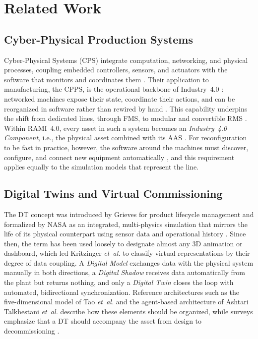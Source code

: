 \documentclass{ieeeojies}
\newcommand{\etal}{\textit{et~al.}}
\begin{document}
\section{Related Work}
\label{sec:related_work}

\subsection{Cyber-Physical Production Systems}
\label{sec:rw_cpps}

Cyber-Physical Systems (CPS) integrate computation, networking, and physical processes, coupling embedded controllers, sensors, and actuators with the software that monitors and coordinates them \cite{Abdel-Aty2022}. Their application to manufacturing, the CPPS, is the operational backbone of Industry~4.0 \cite{Kagermann2022,Hermann2016}: networked machines expose their state, coordinate their actions, and can be reorganized in software rather than rewired by hand \cite{AshtariTalkhestani2019}. This capability underpins the shift from dedicated lines, through FMS, to modular and convertible RMS \cite{Khan2025}. Within RAMI~4.0, every asset in such a system becomes an \textit{Industry~4.0 Component}, i.e., the physical asset combined with its AAS \cite{Pajpach2025}. For reconfiguration to be fast in practice, however, the software around the machines must discover, configure, and connect new equipment automatically \cite{Rocha2024,Ahvanouee2025}, and this requirement applies equally to the simulation models that represent the line.

\subsection{Digital Twins and Virtual Commissioning}
\label{sec:rw_dt_vc}

The DT concept was introduced by Grieves for product lifecycle management \cite{Grieves2014} and formalized by NASA as an integrated, multi-physics simulation that mirrors the life of its physical counterpart using sensor data and operational history \cite{Shafto2012}. Since then, the term has been used loosely to designate almost any 3D animation or dashboard, which led Kritzinger \etal \cite{Kritzinger2018} to classify virtual representations by their degree of data coupling. A \textit{Digital Model} exchanges data with the physical system manually in both directions, a \textit{Digital Shadow} receives data automatically from the plant but returns nothing, and only a \textit{Digital Twin} closes the loop with automated, bidirectional synchronization. Reference architectures such as the five-dimensional model of Tao \etal \cite{Tao2019} and the agent-based architecture of Ashtari Talkhestani \etal \cite{AshtariTalkhestani2019} describe how these elements should be organized, while surveys emphasize that a DT should accompany the asset from design to decommissioning \cite{Jones2020,Semeraro2021}.
\end{document}
